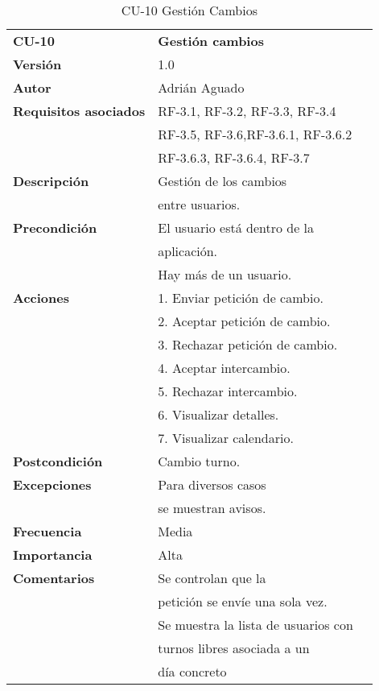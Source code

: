 \begin{table}
\begin{tabular}{llr}  
\toprule
\begin{minipage}[b]{0.24\columnwidth}\raggedright\strut
\textbf{CU-10}\strut
\end{minipage} & \begin{minipage}[b]{0.72\columnwidth}\raggedright\strut
\textbf{Gestión cambios}\strut
\end{minipage}\tabularnewline
\cmidrule(r){1-2}
\textbf{Versión}       & 1.0           \\
\textbf{Autor}       & Adrián  Aguado    \\
\textbf{Requisitos asociados}       & RF-3.1, RF-3.2, RF-3.3, RF-3.4  \\ 
& RF-3.5, RF-3.6,RF-3.6.1, RF-3.6.2 \\ 
& RF-3.6.3, RF-3.6.4,  RF-3.7 \\ 
\textbf{Descripción} & Gestión de los cambios \\
& entre usuarios. \\
\textbf{Precondición}  & El usuario está dentro de la \\
& aplicación.      \\
& Hay más de un usuario. \\
\textbf{Acciones} & 1. Enviar petición de cambio. \\
& 2. Aceptar petición de cambio. \\
& 3. Rechazar petición de cambio. \\
& 4. Aceptar intercambio. \\
& 5. Rechazar intercambio.  \\
& 6. Visualizar detalles.  \\
& 7. Visualizar calendario. \\
\textbf{Postcondición} & Cambio turno. \\
\textbf{Excepciones} &   Para diversos casos  \\
 &   se muestran avisos.  \\
\textbf{Frecuencia} & Media          \\
\textbf{Importancia} & Alta            \\
\textbf{Comentarios } & Se controlan que la       \\
& petición se envíe una sola vez. \\
& Se muestra la lista de usuarios con \\
& turnos libres asociada a un \\
& día concreto \\
\bottomrule
\end{tabular}
\caption{CU-10 Gestión Cambios} 
\end{table}

